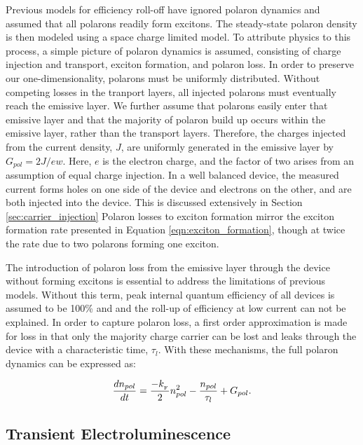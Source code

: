 \documentclass[../thesis.tex]{subfiles}
\begin{document}
Previous models for efficiency roll-off have ignored polaron dynamics and assumed that all polarons readily form excitons.  The steady-state polaron density is then modeled using a space charge limited model.\supercite{Pope1999}
To attribute physics to this process, a simple picture of polaron dynamics is assumed, consisting of charge injection and transport, exciton formation, and polaron loss.  
In order to preserve our one-dimensionality, polarons must be uniformly distributed.  
Without competing losses in the tranport layers, all injected polarons must eventually reach the emissive layer.  
We further assume that polarons easily enter that emissive layer and that the majority of polaron build up occurs within the emissive layer, rather than the transport layers.
Therefore, the charges injected from the current density, $J$, are uniformly generated in the emissive layer by $G_{pol}=2J/ew$.  Here, $e$ is the electron charge, and the factor of two arises from an assumption of equal charge injection.  In a well balanced device, the measured current forms holes on one side of the device and electrons on the other, and are both injected into the device.  
This is discussed extensively in Section \ref{sec:carrier_injection}
Polaron losses to exciton formation mirror the exciton formation rate presented in Equation \ref{eqn:exciton_formation}, though at twice the rate due to two polarons forming one exciton.

The introduction of polaron loss from the emissive layer through the device without forming excitons is essential to address the limitations of previous models.  
Without this term, peak internal quantum efficiency of all devices is assumed to be 100\% and and the roll-up of efficiency at low current can not be explained.  
In order to capture polaron loss, a first order approximation is made for loss in that only the majority charge carrier can be lost and leaks through the device with a characteristic time, $\tau_l$.
With these mechanisms, the full polaron dynamics can be expressed as:




\begin{equation}
\frac{dn_{pol}}{dt}=\frac{-k_{_\text{\tiny F}}}{2}n_{pol}^2-\frac{n_{pol}}{\tau_l}+G_{pol}.
\label{eqn:polaron_rate}
\end{equation}

\subsection{Transient Electroluminescence} \label{sec:transient_el}
\end{document}

